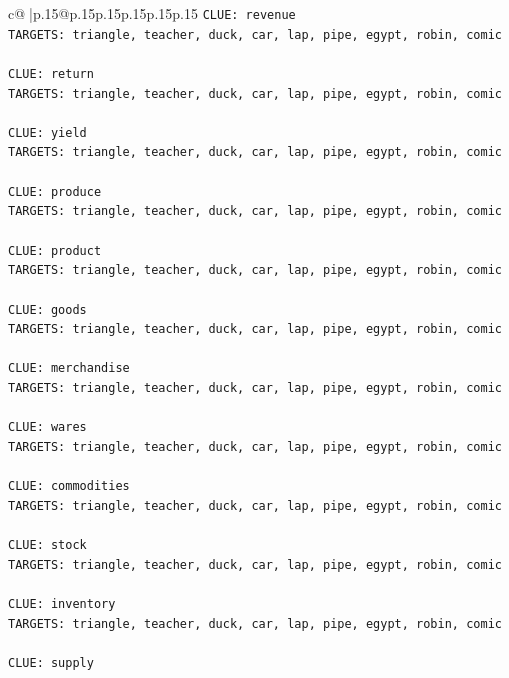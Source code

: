 \documentclass{article}
\begin{document}
{\begin{supertabular}{c@{$\;$}|p{.15\linewidth}@{}p{.15\linewidth}p{.15\linewidth}p{.15\linewidth}p{.15\linewidth}p{.15\linewidth}}
{{{\texttt{CLUE: revenue} \\
\texttt{TARGETS: triangle, teacher, duck, car, lap, pipe, egypt, robin, comic} \\
\\ 
\texttt{CLUE: return} \\
\texttt{TARGETS: triangle, teacher, duck, car, lap, pipe, egypt, robin, comic} \\
\\ 
\texttt{CLUE: yield} \\
\texttt{TARGETS: triangle, teacher, duck, car, lap, pipe, egypt, robin, comic} \\
\\ 
\texttt{CLUE: produce} \\
\texttt{TARGETS: triangle, teacher, duck, car, lap, pipe, egypt, robin, comic} \\
\\ 
\texttt{CLUE: product} \\
\texttt{TARGETS: triangle, teacher, duck, car, lap, pipe, egypt, robin, comic} \\
\\ 
\texttt{CLUE: goods} \\
\texttt{TARGETS: triangle, teacher, duck, car, lap, pipe, egypt, robin, comic} \\
\\ 
\texttt{CLUE: merchandise} \\
\texttt{TARGETS: triangle, teacher, duck, car, lap, pipe, egypt, robin, comic} \\
\\ 
\texttt{CLUE: wares} \\
\texttt{TARGETS: triangle, teacher, duck, car, lap, pipe, egypt, robin, comic} \\
\\ 
\texttt{CLUE: commodities} \\
\texttt{TARGETS: triangle, teacher, duck, car, lap, pipe, egypt, robin, comic} \\
\\ 
\texttt{CLUE: stock} \\
\texttt{TARGETS: triangle, teacher, duck, car, lap, pipe, egypt, robin, comic} \\
\\ 
\texttt{CLUE: inventory} \\
\texttt{TARGETS: triangle, teacher, duck, car, lap, pipe, egypt, robin, comic} \\
\\ 
\texttt{CLUE: supply} \\
}}}
\end{supertabular}}
\end{document}
